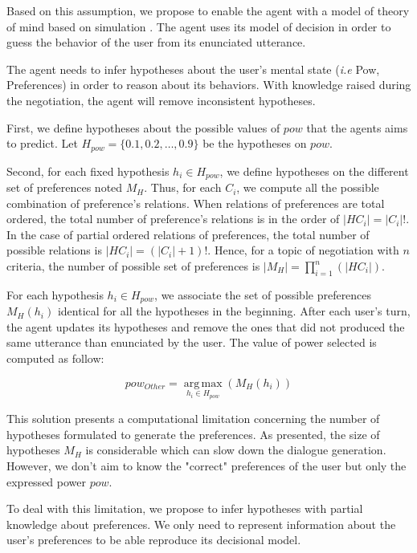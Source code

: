 \documentclass{llncs}
\begin{document}
	Based on this assumption, we propose to enable the agent with a model of theory of mind based on simulation \cite{bibid}. The agent uses its model of decision in order to guess the behavior of the user from its enunciated utterance.   
	
	The agent needs to infer hypotheses about the user's mental state (\emph{i.e} Pow, Preferences) in order to reason about its behaviors. With knowledge raised during the negotiation, the agent will remove inconsistent hypotheses.
	
	First, we define hypotheses about the possible values of $pow$ that the agents aims to predict. Let $H_{pow} = \{0.1, 0.2, \ldots, 0.9\}$ be the hypotheses on $pow$.
	
	Second, for each fixed hypothesis $ h_i \in H_{pow}$, we define hypotheses on the different set of preferences  noted $M_H $. Thus, for each $C_i$, we compute all the possible combination of preference's relations. When relations of preferences are total ordered, the total number of preference's relations is in the order of $|H{C_i}| = |C_i|!$. In the case of partial ordered relations of preferences, the total number of possible relations is  $ |H{C_i}| = (|C_i| + 1)!$. Hence, for a topic of negotiation with $n$ criteria, the number of possible set of preferences is $ |M_H| = \prod_{i=1}^n (|H{C_i}|)$. 
	
	For each hypothesis $ h_i \in H_{pow}$, we associate the set of possible preferences $M_H(h_i)$ identical for all the hypotheses in the beginning. After each user's turn, the agent updates its hypotheses and remove the ones that did not produced the same utterance than enunciated by the user. The value of power selected is computed as follow:
	
	\begin{equation}
		pow_{Other} = \operatorname*{arg\,max}_{h_i \in H_{pow}} ( M_H(h_i))
	\end{equation} 
	
	This solution presents a computational limitation concerning the number of hypotheses formulated to generate the preferences. As presented, the size of hypotheses $M_H$ is considerable which can slow down the dialogue generation. However, we don't aim to know the "correct" preferences of the user but only the expressed power $pow$. 
	
	To deal with this limitation, we propose to infer hypotheses with partial knowledge about preferences. We only need to represent information about the user's preferences to be able reproduce its decisional model. 
	
\end{document}
